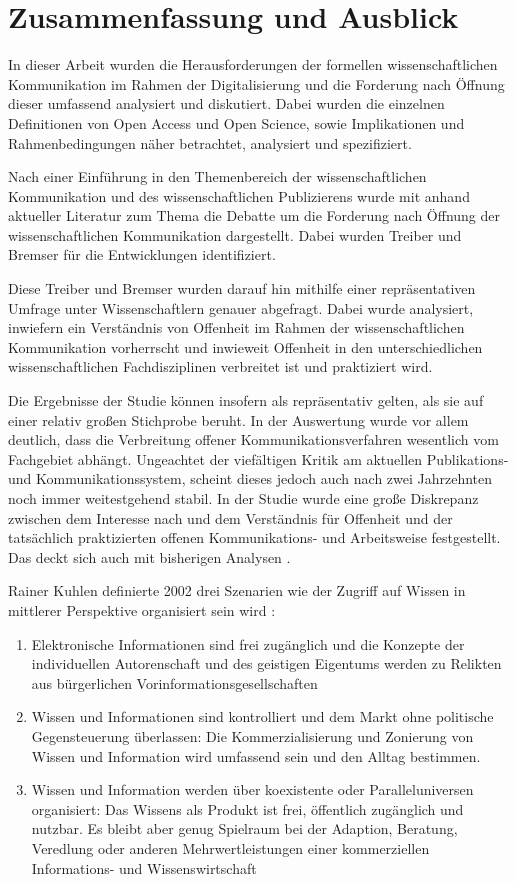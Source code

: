 \chapter{Zusammenfassung und Ausblick}

In dieser Arbeit wurden die Herausforderungen der formellen wissenschaftlichen Kommunikation im Rahmen der Digitalisierung und die Forderung nach Öffnung dieser umfassend analysiert und diskutiert. Dabei wurden die einzelnen Definitionen von Open Access und Open Science, sowie Implikationen und Rahmenbedingungen näher betrachtet, analysiert und spezifiziert.

Nach einer Einführung in den Themenbereich der wissenschaftlichen Kommunikation und des wissenschaftlichen Publizierens wurde mit anhand aktueller Literatur zum Thema die Debatte um die Forderung nach Öffnung der wissenschaftlichen Kommunikation dargestellt. Dabei wurden Treiber und Bremser für die Entwicklungen identifiziert.

Diese Treiber und Bremser wurden darauf hin mithilfe einer repräsentativen Umfrage unter Wissenschaftlern genauer abgefragt. Dabei wurde analysiert, inwiefern ein Verständnis von Offenheit im Rahmen der wissenschaftlichen Kommunikation vorherrscht und inwieweit Offenheit in den unterschiedlichen wissenschaftlichen Fachdisziplinen verbreitet ist und praktiziert wird.

Die Ergebnisse der Studie können insofern als repräsentativ gelten, als sie auf einer relativ großen Stichprobe beruht. In der Auswertung wurde vor allem deutlich, dass die Verbreitung offener Kommunikationsverfahren wesentlich vom Fachgebiet abhängt. Ungeachtet der viefältigen Kritik am aktuellen Publikations- und Kommunikationssystem, scheint dieses jedoch auch nach zwei Jahrzehnten noch immer weitestgehend stabil. In der Studie wurde eine große Diskrepanz zwischen dem Interesse nach und dem Verständnis für Offenheit und der tatsächlich praktizierten offenen Kommunikations- und Arbeitsweise festgestellt. Das deckt sich auch mit bisherigen Analysen \cite{Bartling_2013}.

Rainer Kuhlen definierte 2002 drei Szenarien wie der Zugriff auf Wissen in mittlerer Perspektive organisiert sein wird \cite{Kuhlen_2002_universalaccess}:
\begin{enumerate}
\item Elektronische Informationen sind frei zugänglich und die Konzepte der individuellen Autorenschaft und des geistigen Eigentums werden zu Relikten aus bürgerlichen Vorinformationsgesellschaften
\item Wissen und Informationen sind kontrolliert und dem Markt ohne politische Gegensteuerung überlassen: Die Kommerzialisierung und Zonierung von Wissen und Information wird umfassend sein und den Alltag bestimmen.
\item Wissen und Information werden über koexistente oder Paralleluniversen organisiert: Das Wissens als Produkt ist frei, öffentlich zugänglich und nutzbar. Es bleibt aber genug Spielraum bei der Adaption, Beratung, Veredlung oder anderen Mehrwertleistungen einer kommerziellen Informations- und Wissenswirtschaft
\end{enumerate}

